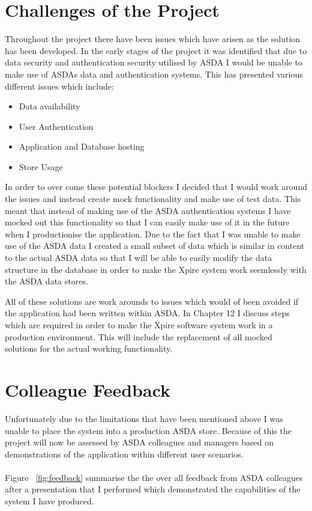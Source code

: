 \documentclass[a4paper,11pt]{report}
\begin{document}
\section {Challenges of the Project}
Throughout the project there have been issues which have arisen as the solution has been developed. In the early stages of the project it was identified that due to data security and authentication security utilised by ASDA I would be unable to make use of ASDAs data and authentication systems. This has presented various different issues which include:
\begin{itemize}
    \item Data availability
    \item User Authentication
    \item Application and Database hosting
    \item Store Usage
\end{itemize}
 In order to over come these potential blockers I decided that I would work around the issues and instead create mock functionality and make use of test data. This meant that instead of making use of the ASDA authentication systems I have mocked out this functionality so that I can easily make use of it in the future when I productionise the application. 
 Due to the fact that I was unable to make use of the ASDA data I created a small subset of data which is similar in content to the actual ASDA data so that I will be able to easily modify the data structure in the database in order to make the Xpire system work seemlessly with the ASDA data stores. 

 All of these solutions are work arounds to issues which would of been avoided if the application had been written within ASDA. In Chapter 12 I discuss steps which are required in order to make the Xpire software system work in a production environment. This will include the replacement of all mocked solutions for the actual working functionality. 


\section{Colleague Feedback}
Unfortunately due to the limitations that have been mentioned above I was unable to place the system into a production ASDA store.
Because of this the project will now be assessed by ASDA colleagues and managers based on demonstrations of the application within different user scenarios. 
\\
\\
Figure ~\ref{fig:feedback} summarise the the over all feedback from ASDA colleagues after a presentation that I performed which demonstrated the capabilities of the system I have produced.
\end{document}
